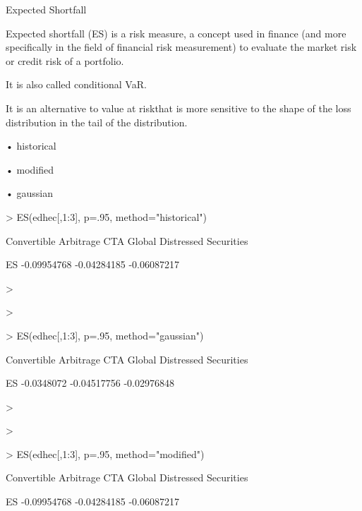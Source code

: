 Expected Shortfall


Expected shortfall (ES) is a risk measure, a concept used in finance (and more specifically in the field of financial risk measurement) to evaluate the market risk or credit risk of a portfolio. 


It is also called conditional VaR.


It is an alternative to value at riskthat is more sensitive to the shape of the loss distribution in the tail of the distribution. 

•
historical

•
modified

•
gaussian










> ES(edhec[,1:3], p=.95, method="historical")

   

    Convertible Arbitrage  CTA Global       Distressed Securities

ES  -0.09954768            -0.04284185      -0.06087217

> 

>

> ES(edhec[,1:3], p=.95, method="gaussian")


     Convertible Arbitrage  CTA Global      Distressed Securities

ES   -0.0348072             -0.04517756     -0.02976848

>

>

> ES(edhec[,1:3], p=.95, method="modified")


     Convertible Arbitrage  CTA Global      Distressed Securities

ES   -0.09954768            -0.04284185     -0.06087217
 


